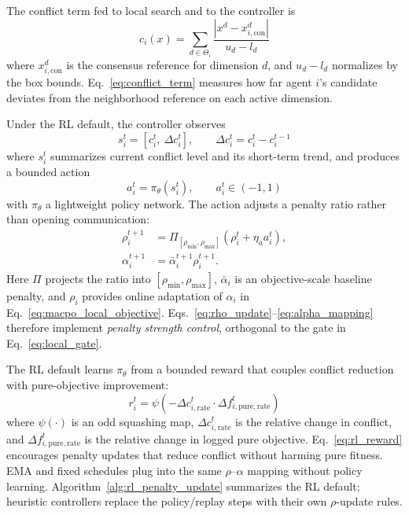\documentclass[conference]{IEEEtran}
\begin{document}
The conflict term fed to local search and to the controller is
\begin{equation}
c_i(x)=\sum_{d\in\Theta_i}\frac{|x^d-x_{i,\mathrm{con}}^d|}{u_d-l_d}
\label{eq:conflict_term}
\end{equation}
where $x_{i,\mathrm{con}}^d$ is the consensus reference for dimension $d$, and $u_d-l_d$ normalizes by the box bounds. Eq.~\eqref{eq:conflict_term} measures how far agent $i$'s candidate deviates from the neighborhood reference on each active dimension.

Under the RL default, the controller observes
\begin{equation}
s_i^t=[c_i^t,\ \Delta c_i^t],\qquad \Delta c_i^t=c_i^t-c_i^{t-1}
\label{eq:rl_state}
\end{equation}
where $s_i^t$ summarizes current conflict level and its short-term trend, and produces a bounded action
\begin{equation}
a_i^t=\pi_\theta(s_i^t),\qquad a_i^t\in(-1,1)
\label{eq:rl_action}
\end{equation}
with $\pi_\theta$ a lightweight policy network. The action adjusts a penalty ratio rather than opening communication:
\begin{subequations}
\begin{align}
\rho_i^{t+1}&=\Pi_{[\rho_{\min},\rho_{\max}]}
\left(\rho_i^t+\eta_a a_i^t\right),
\label{eq:rho_update}\\
\alpha_i^{t+1}&=\bar{\alpha}_i^{t+1}\rho_i^{t+1}.
\label{eq:alpha_mapping}
\end{align}
\end{subequations}
Here $\Pi$ projects the ratio into $[\rho_{\min},\rho_{\max}]$, $\bar{\alpha}_i$ is an objective-scale baseline penalty, and $\rho_i$ provides online adaptation of $\alpha_i$ in Eq.~\eqref{eq:macpo_local_objective}. Eqs.~\eqref{eq:rho_update}--\eqref{eq:alpha_mapping} therefore implement \emph{penalty strength control}, orthogonal to the gate in Eq.~\eqref{eq:local_gate}.

The RL default learns $\pi_\theta$ from a bounded reward that couples conflict reduction with pure-objective improvement:
\begin{equation}
r_i^t=\psi\left(-\Delta c_{i,\mathrm{rate}}^t\cdot \Delta f_{i,\mathrm{pure,rate}}^t\right)
\label{eq:rl_reward}
\end{equation}
where $\psi(\cdot)$ is an odd squashing map, $\Delta c_{i,\mathrm{rate}}^t$ is the relative change in conflict, and $\Delta f_{i,\mathrm{pure,rate}}^t$ is the relative change in logged pure objective. Eq.~\eqref{eq:rl_reward} encourages penalty updates that reduce conflict without harming pure fitness. EMA and fixed schedules plug into the same $\rho$--$\alpha$ mapping without policy learning. Algorithm~\ref{alg:rl_penalty_update} summarizes the RL default; heuristic controllers replace the policy/replay steps with their own $\rho$-update rules.
\end{document}
